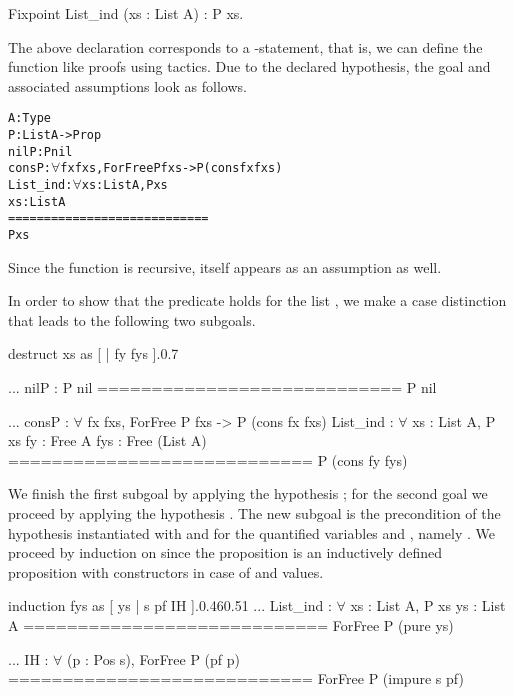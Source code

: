\begin{coqcode}
Fixpoint List_ind (xs : List A) : P xs.
\end{coqcode}

\noindent%
The above declaration corresponds to a \--statement, that is, we can define the function like proofs using tactics.
Due to the declared hypothesis, the goal and associated assumptions look as follows.

\begin{alltt}
  A : Type
  P : List A -> Prop
  nilP : P nil
  consP : \(\forall\) fx fxs, ForFree P fxs -> P (cons fx fxs)
  List_ind : \(\forall\) xs : List A, P xs
  xs : List A
  ============================
  P xs
\end{alltt}

\noindent Since the function is recursive,  itself appears as an assumption as well.

In order to show that the predicate  holds for the list , we make a case distinction that leads to the following two subgoals.

\begin{cproof2}{destruct xs as [ | fy fys ].}{0.7}

  ...
  nilP : P nil
  ============================
  P nil

  ...
  consP : \(\forall\) fx fxs, ForFree P fxs -> P (cons fx fxs)
  List_ind : \(\forall\) xs : List A, P xs
  fy : Free A
  fys : Free  (List A)
  ============================
  P (cons fy fys)
\end{cproof2}

\noindent We finish the first subgoal by applying the hypothesis ; for the second goal we proceed by applying the hypothesis .
The new subgoal is the precondition of the hypothesis  instantiated with  and  for the quantified variables  and , namely .
We proceed by induction on  since the proposition  is an inductively defined proposition with constructors in case of  and  values.

\begin{cproof1}{induction fys as [ ys | s pf IH ].}{0.46}{0.51}
  ...
  List_ind : \(\forall\) xs : List A, P xs
  ys : List A
  ============================
  ForFree P (pure ys)

  ...
  IH : \(\forall\) (p : Pos s), ForFree P (pf p)
  ============================
  ForFree P (impure s pf)
\end{cproof1}

